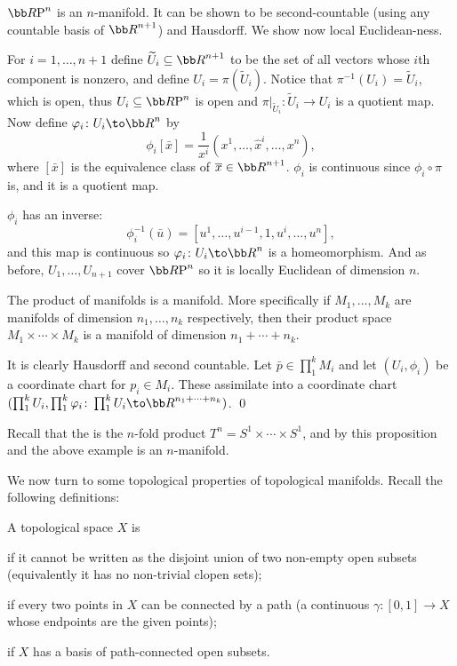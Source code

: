     $\RP^n$ is an $n$-manifold.
    It can be shown to be second-countable (using any countable basis of $\bR^{n+1}$) and Hausdorff.
    We show now local Euclidean-ness.

    For $i=1,\dots,n+1$ define $\tilde U_i\subseteq\bR^{n+1}$ to be the set of all vectors whose $i$th component is nonzero, and define $U_i=\pi(\tilde U_i)$.
    Notice that $\pi^{-1}(U_i)=\tilde U_i$, which is open, thus $U_i\subseteq\RP^n$ is open and $\pi|_{\tilde U_i}\colon\tilde U_i\to U_i$ is a quotient map.
    Now define $\phi_i\colon U_i\to\bR^n$ by
    $$ \phi_i[\bar x] = \frac1{x^i}(x^1,\dots,\hat x^i,\dots,x^n) , $$
    where $[\bar x]$ is the equivalence class of $\bar x\in\bR^{n+1}$.
    $\phi_i$ is continuous since $\phi_i\circ\pi$ is, and it is a quotient map.

    $\phi_i$ has an inverse:
    $$ \phi_i^{-1}(\bar u) = [u^1,\dots,u^{i-1},1,u^i,\dots,u^n], $$
    and this map is continuous so $\phi_i\colon U_i\to\bR^n$ is a homeomorphism.
    And as before, $U_1,\dots,U_{n+1}$ cover $\RP^n$ so it is locally Euclidean of dimension $n$.

\eexam

\bprop

    The product of manifolds is a manifold.
    More specifically if $M_1,\dots,M_k$ are manifolds of dimension $n_1,\dots,n_k$ respectively, then their product space $M_1\times\cdots\times M_k$ is a manifold
    of dimension $n_1+\cdots+n_k$.

\eprop

\bproof

    It is clearly Hausdorff and second countable.
    Let $\bar p\in\prod_1^kM_i$ and let $(U_i,\phi_i)$ be a coordinate chart for $p_i\in M_i$.
    These assimilate into a coordinate chart $(\prod_1^kU_i,\prod_1^k\phi_i\colon\prod_1^kU_i\to\bR^{n_1+\cdots+n_k})$.
    \qed

\eproof

Recall that the  is the $n$-fold product $T^n=S^1\times\cdots\times S^1$, and by this proposition and the above example is an $n$-manifold.

We now turn to some topological properties of topological manifolds.
Recall the following definitions:

\bdefn

    A topological space $X$ is
    \benum
        \item {} if it cannot be written as the disjoint union of two non-empty open subsets (equivalently it has no non-trivial clopen sets);
        \item {} if every two points in $X$ can be connected by a path (a continuous $\gamma\colon[0,1]\to X$ whose endpoints are the given points);
        \item {} if $X$ has a basis of path-connected open subsets.
    \eenum

